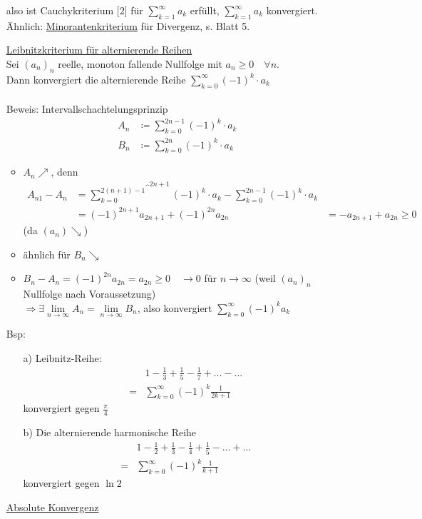 \documentclass[12pt, titlepage]{article}
\newcommand{\infn}{n\rightarrow\infty}
\renewcommand{\*}{\cdot}
\begin{document}
\begin{itemize}
		also ist Cauchykriterium [2] für $\sum_{k=1}^{\infty}a_k$ erfüllt, $\sum_{k=1}^{\infty}a_k$ konvergiert.\\
		Ähnlich: \underline{Minorantenkriterium} für Divergenz, s. Blatt 5.
		\item[\fbox{5}] \underline{Leibnitzkriterium für alternierende Reihen}\\
		Sei $(a_n)_n$ reelle, monoton fallende Nullfolge mit $a_n\geq0\quad\forall n$.\\
		Dann konvergiert die alternierende Reihe $\sum_{k=0}^{\infty}(-1)^k\*a_k$\\
		\\
		Beweis: Intervallschachtelungsprinzip
		\begin{align*}
			A_n&\coloneqq\sum_{k=0}^{2n-1}(-1)^k\*a_k\\
			B_n&\coloneqq\sum_{k=0}^{2n}(-1)^k\*a_k
		\end{align*}
	\begin{itemize}
		\item $A_n\nearrow$, denn
		\begin{align*}
			A_{n1}-A_n & =\overbrace{\sum_{k=0}^{2(n+1)-1}}^{2n+1}(-1)^k\*a_k-\sum_{k=0}^{2n-1}(-1)^k\*a_k &  \\
			           & =(-1)^{2n+1}a_{2n+1}+(-1)^{2n}a_{2n}                                              & =-a_{2n+1}+a_{2n}\geq 0
		\end{align*}
		(da $(a_n)\searrow$)
		\item ähnlich für $B_n\searrow$
		\item $B_n-A_n=(-1)^{2n}a_{2n}=a_{2n}\geq0\quad\longrightarrow0$ für $\infn$ (weil $(a_n)_n$ Nullfolge nach Voraussetzung)\\
		$\Rightarrow\exists\lim\limits_{\infn}A_n=\lim\limits_{\infn}B_n$, also konvergiert $\sum_{k=0}^{\infty}(-1)^ka_k$
	\end{itemize}
	Bsp:
	\begin{itemize}
		\item[a)] Leibnitz-Reihe:
		\begin{align*}
			&1-\frac{1}{3}+\frac{1}{5}-\frac{1}{7}+...-...\\
			=&\sum_{k=0}^{\infty}(-1)^k\frac{1}{2k+1}
		\end{align*}
		konvergiert gegen $\frac{\pi}{4}$
		\item[b)] Die alternierende harmonische Reihe
		\begin{align*}
			&1-\frac{1}{2}+\frac{1}{3}-\frac{1}{4}+\frac{1}{5}-...+...\\
			=&\sum_{k=0}^{\infty}(-1)^k\frac{1}{k+1}
		\end{align*}
		konvergiert gegen $\ln2$
	\end{itemize}
	\item[\fbox{6}] \underline{Absolute Konvergenz}

\end{itemize}
\end{document}
